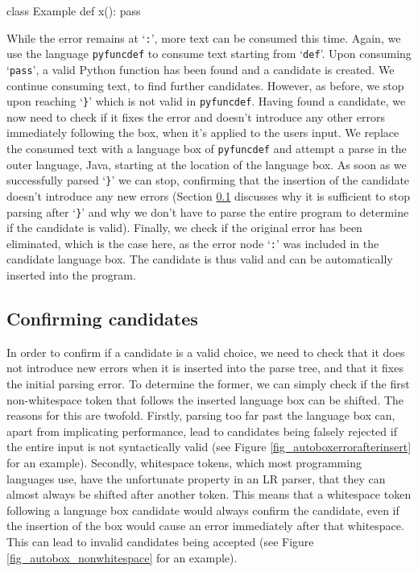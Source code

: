 \documentclass[sigplan,screen]{acmart}\settopmatter{printfolios=true,printccs=false,printacmref=false}
\newcommand{\qtt}[1]{`\texttt{#1}'\xspace}
\begin{document}
\begin{minipage}{\linewidth}
\begin{lstdefault}[language=Java]
  class Example {
      def x():
          pass
  }
\end{lstdefault}
\end{minipage}
\vspace{1em}

While the error remains at \qtt{:}, more text can be consumed this time. Again,
we use the language \texttt{pyfuncdef} to consume text starting from \qtt{def}.
Upon consuming \qtt{pass}, a valid Python function has been found and a
candidate is created. We continue consuming text, to find further candidates.
However, as before, we stop upon reaching \qtt{\}} which is not valid in
\texttt{pyfuncdef}. Having found a candidate, we now need to check if it fixes
the error and doesn't introduce any other errors immediately following the box,
when it's applied to the users input. We replace the consumed text with a
language box of \texttt{pyfuncdef} and attempt a parse in the outer language,
Java, starting at the location of the language box.
As soon as we successfully parsed \qtt{\}} we can stop,
confirming that the insertion of the candidate doesn't introduce
any new errors (Section \ref{sec:parse_after_lbox} discusses why it is
sufficient to stop parsing after \qtt{\}} and why we don't have to parse the
entire program to determine if the candidate is valid). Finally, we check if
the original error has been eliminated, which is the case here, as the error
node \qtt{:} was included in the candidate language box. The candidate is thus
valid and can be automatically inserted into the program.

\subsection{Confirming candidates}
\label{sec:parse_after_lbox}

In order to confirm if a candidate is a valid choice, we need to
check that it does not introduce new errors when it is inserted into the parse
tree, and that it fixes the initial parsing error. To determine the former, we
can simply check if the first non-whitespace token that follows the inserted
language box can be shifted. The reasons for this are
twofold. Firstly, parsing too far past the language box can, apart from
implicating performance, lead to candidates being falsely
rejected if the entire input is not syntactically valid (see Figure \ref{fig_autoboxerrorafterinsert} for an example).
Secondly, whitespace tokens, which most programming languages use, have the
unfortunate property in an LR parser, that they can almost always be shifted after another token. This
means that a whitespace token following a language box candidate would always
confirm the candidate, even if the insertion of the box would cause an error
immediately after that whitespace. This can lead to invalid
candidates being accepted (see Figure \ref{fig_autobox_nonwhitespace} for an
example).
\end{document}

